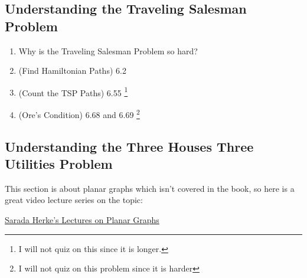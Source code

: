 \documentclass[11pt, letterpaper]{article}
\begin{document}
\subsection{Understanding the Traveling Salesman Problem}

\begin{enumerate}
	\item Why is the Traveling Salesman Problem so hard?
	\item (Find Hamiltonian Paths) 6.2
	\item (Count the TSP Paths) 6.55 \footnote{I will not quiz on this since it is longer.}
	\item (Ore's Condition) 6.68 and 6.69 \footnote{I will not quiz on this problem since it is harder}
\end{enumerate}

\subsection{Understanding the Three Houses Three Utilities Problem}
This section is about planar graphs which isn't covered in the book, so here is a great video lecture series on the topic:
\begin{center}
	\href{https://www.youtube.com/playlist?list=PLGxuz-nmYlQPgIHbqWtgD-F7NnJuqs4fH}{Sarada Herke's Lectures on Planar Graphs}
\end{center}
\end{document}
